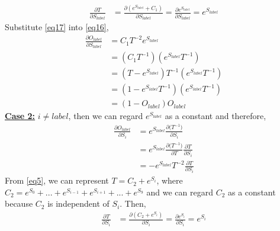 \documentclass[a4paper,12pt]{article}
\begin{document}
\begin{equation}
\begin{aligned}
\frac{\partial{T}}{\partial{S_{label}}} &= \frac{\partial{(e^{S_{label}} + C_1)}}{\partial{S_{label}}} = \frac{\partial{e^{S_{label}}}}{\partial{S_{label}}} = e^{S_{label}} \label{eq17}
\end{aligned}
\end{equation}
Substitute \eqref{eq17} into \eqref{eq16},
\begin{equation}
\begin{aligned}
\frac{\partial{O_{label}}}{\partial{S_{label}}} &= C_1T^{-2}e^{S_{label}} \\
                                                &= (C_1T^{-1})(e^{S_{label}}T^{-1}) \\
                                                &= (T - e^{S_{label}})T^{-1}(e^{S_{label}}T^{-1}) \\
                                                &= (1 - e^{S_{label}}T^{-1})(e^{S_{label}}T^{-1}) \\
                                                &= (1 - O_{label})O_{label} \label{eq18}
\end{aligned}
\end{equation}
\textbf{\underline{Case 2:}} $i \neq label$, then we can regard $e^{S_{label}}$ as a constant and therefore,
\begin{equation}
\begin{aligned}
\frac{\partial{O_{label}}}{\partial{S_i}} &= e^{S_{label}}\frac{\partial{\big(T^{-1}\big)}}{\partial{S_i}} \\
                                          &= e^{S_{label}}\frac{\partial{\big(T^{-1}\big)}}{\partial{T}}\frac{{\partial{T}}}{\partial{S_i}} \\
                                          &= -e^{S_{label}}T^{-2}\frac{{\partial{T}}}{\partial{S_i}} \label{eq19}
\end{aligned}
\end{equation}
From \eqref{eq5}, we can represent $T = C_2 + e^{S_i}$, where $C_2 = e^{S_0} + ... + e^{S_{i - 1}} + e^{S_{i + 1}} + ... + e^{S_{9}}$ and we can regard $C_2$ as a constant because $C_2$ is independent of $S_i$. Then,
\begin{equation}
\begin{aligned}
\frac{{\partial{T}}}{\partial{S_i}} &= \frac{\partial{(C_2 + e^{S_i})}}{\partial{S_i}} = \frac{\partial{e^{S_i}}}{\partial{S_i}} = e^{S_i} \label{eq20}
\end{aligned}
\end{equation}
\end{document}
